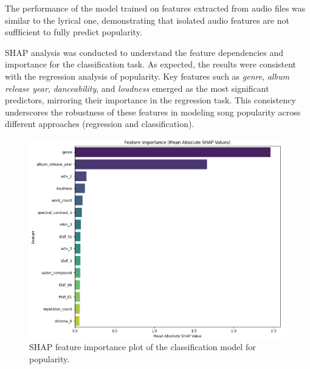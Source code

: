 The performance of the model trained on features extracted from audio files was
similar to the lyrical one, demonstrating that isolated audio features are not
suffficient to fully predict popularity.


SHAP analysis was conducted to understand the feature dependencies and
importance for the classification task. As expected, the results were
consistent with the regression analysis of popularity. Key features such as
\textit{genre}, \textit{album release year}, \textit{danceability}, and \textit{loudness} emerged as the most
significant predictors, mirroring their importance in the regression task. This
consistency underscores the robustness of these features in modeling song
popularity across different approaches (regression and classification).

\begin{center}
\begin{figure}[H]
  \centering
  \includegraphics[width=5in]{img/feature_importance_popularity_clf.png}
  \caption{SHAP feature importance plot of the classification model for popularity.}
  \label{Figure:fig_beh}
\end{figure}
\end{center}

